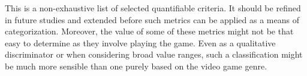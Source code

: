 This is a non-exhaustive list of selected quantifiable criteria.
It should be refined in future studies and extended before such metrics can be applied as a means of categorization.
Moreover, the value of some of these metrics might not be that easy to determine as they involve playing the game. Even as a qualitative discriminator or when considering broad value ranges, such a classification might be much more sensible than one purely based on the video game genre.